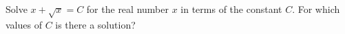 Solve $x+\sqrt x=C$ for the real number $x$ in terms of the constant $C$. For which values of $C$ is there a solution?
